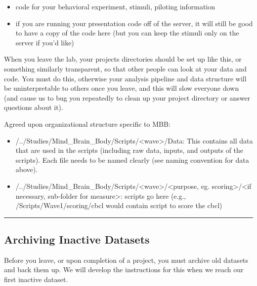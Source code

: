 \documentclass[
]{book}
\providecommand{\tightlist}{%
  \setlength{\itemsep}{0pt}\setlength{\parskip}{0pt}}
\begin{document}
\begin{itemize}
  \begin{itemize}
  \tightlist
  \item
    code for your behavioral experiment, stimuli, piloting information
  \item
    if you are running your presentation code off of the server, it will still be good to have a copy of the code here (but you can keep the stimuli only on the server if you'd like)
  \end{itemize}
\end{itemize}

When you leave the lab, your projects directories should be set up like this, or something similarly transparent, so that other people can look at your data and code. You must do this, otherwise your analysis pipeline and data structure will be uninterpretable to others once you leave, and this will slow everyone down (and cause us to bug you repeatedly to clean up your project directory or answer questions about it).

Agreed upon organizational structure specific to MBB:

\begin{itemize}
\tightlist
\item
  /../Studies/Mind\_Brain\_Body/Scripts/\textless wave\textgreater/Data: This contains all data that are used in the scripts (including raw data, inputs, and outputs of the scripts). Each file needs to be named clearly (see naming convention for data above).
\item
  /../Studies/Mind\_Brain\_Body/Scripts/\textless wave\textgreater/\textless purpose, eg. scoring\textgreater/\textless if necessary, sub-folder for measure\textgreater: scripts go here (e.g., /Scripts/Wave1/scoring/cbcl would contain script to score the cbcl)
\end{itemize}

\begin{center}\rule{0.5\linewidth}{0.5pt}\end{center}

\hypertarget{archiving-inactive-datasets}{%
\subsection{Archiving Inactive Datasets}\label{archiving-inactive-datasets}}

Before you leave, or upon completion of a project, you must archive old datasets and back them up. We will develop the instructions for this when we reach our first inactive dataset.
\end{document}

